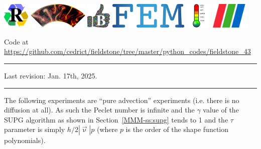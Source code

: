 \noindent
\includegraphics[height=1.25cm]{images/pictograms/replication}
\includegraphics[height=1.25cm]{images/pictograms/aspect_logo}
\includegraphics[height=1.25cm]{images/pictograms/benchmark}
\includegraphics[height=1.25cm]{images/pictograms/FEM}
\includegraphics[height=1.25cm]{images/pictograms/temperature}
\includegraphics[height=1.25cm]{images/pictograms/paraview}


%

\begin{center}
Code at \url{https://github.com/cedrict/fieldstone/tree/master/python_codes/fieldstone_43}
\end{center}

\par\noindent\rule{\textwidth}{0.4pt}

Last revision: Jan. 17th, 2025.

\par\noindent\rule{\textwidth}{0.4pt}


The following experiments are ``pure advection'' experiments (i.e. there is 
no diffusion at all). As such the Peclet number
is infinite and the $\gamma$ value of the SUPG algorithm as shown in Section~\ref{MMM-ss:supg} tends to 1
and the $\tau$ parameter is simply $h/2 |\vec\upnu| p$ (where $p$ is the order of 
the shape function polynomials).


